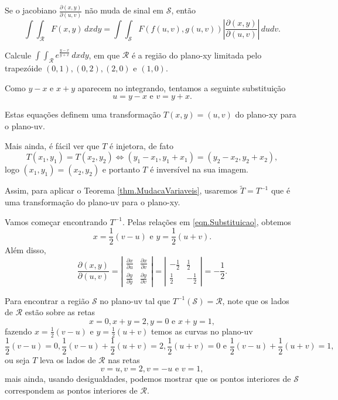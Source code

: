 \begin{corollary}\label{coro.MudancaVariaveis}
    Se o jacobiano \(\frac{\partial(x,y)}{\partial(u,v)}\) não muda de sinal em \(\mathcal{S}\), então \[\int\int_\mathcal{R} F(x,y)\, dxdy = \int\int_\mathcal{S} F(f(u,v),g(u,v)) \left|\frac{\partial(x,y)}{\partial(u,v)}\right|\, dudv.\]
\end{corollary}

\begin{example}
    Calcule \(\int\int_\mathcal{R} e^{\frac{y-x}{y+x}}\, dxdy\), em que \(\mathcal{R}\) é a região do plano-xy limitada pelo trapezóide \((0,1), (0,2), (2,0)\) e \((1,0)\).

    Como \(y-x\) e \(x+y\) aparecem no integrando, tentamos a seguinte substituição
        \begin{equation}\label{eqn.Substituicao}
            u = y-x \text{ e } v = y+x.
        \end{equation}

    Estas equações definem uma transformação \(T(x,y) = (u,v)\) do plano-xy para o plano-uv.

    Mais ainda, é fácil ver que \(T\) é injetora, de fato \[T(x_1,y_1) = T(x_2,y_2) \Leftrightarrow (y_1 - x_1, y_1 + x_1) = (y_2 - x_2, y_2 + x_2),\] logo \((x_1,y_1) = (x_2,y_2)\) e portanto \(T\) é inversível na sua imagem.

    Assim, para aplicar o Teorema \ref{thm.MudacaVariaveis}, usaremos \(\tilde{T} = T^{-1}\) que é uma transformação do plano-uv para o plano-xy.

    Vamos começar encontrando \(T^{-1}\). Pelas relações em \eqref{eqn.Substituicao}, obtemos \[x = \frac{1}{2}(v-u) \text{ e } y = \frac{1}{2}(u+v).\] Além disso, \[\frac{\partial(x,y)}{\partial(u,v)} = \left|\begin{matrix}
        \frac{\partial x}{\partial u} & \frac{\partial x}{\partial v} \\ \frac{\partial y}{\partial y} & \frac{\partial y}{\partial v}
    \end{matrix}\right| = \left|\begin{matrix}
        -\frac{1}{2} & \frac{1}{2}\\ \frac{1}{2} & -\frac{1}{2}
    \end{matrix}\right| = -\frac{1}{2}.\]

    Para encontrar a região \(\mathcal{S}\) no plano-uv tal que \(T^{-1}(\mathcal{S}) = \mathcal{R}\), note que os lados de \(\mathcal{R}\) estão sobre as retas \[x = 0, x+y = 2, y=0 \text{ e } x+y = 1,\] fazendo \(x = \frac{1}{2}(v-u)\) e \(y = \frac{1}{2}(u+v)\) temos as curvas no plano-uv \[\frac{1}{2}(v-u) = 0, \frac{1}{2}(v-u) + \frac{1}{2}(u+v) = 2, \frac{1}{2}(u+v) = 0 \text{ e } \frac{1}{2}(v-u) + \frac{1}{2}(u+v) = 1,\] ou seja \(T\) leva os lados de \(\mathcal{R}\) nas retas \[v = u, v = 2, v = -u \text{ e } v = 1,\] mais ainda, usando desigualdades, podemos mostrar que os pontos interiores de \(\mathcal{S}\) correspondem as pontos interiores de \(\mathcal{R}\).


\end{example}
